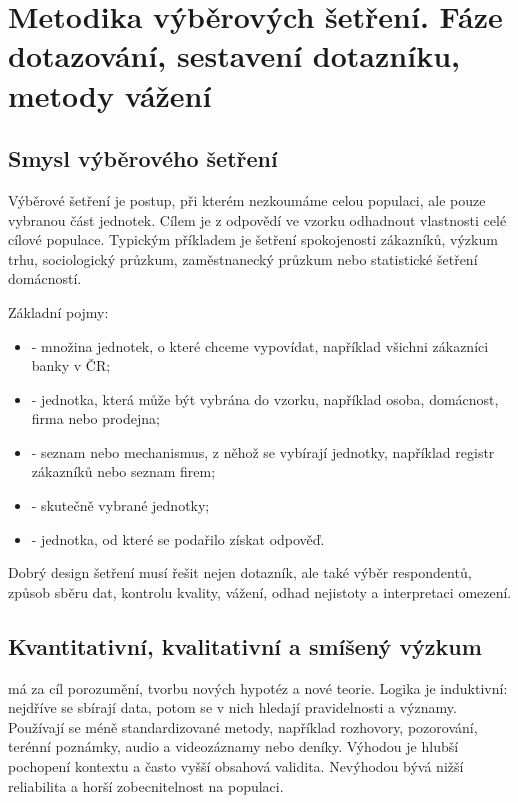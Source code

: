 \section{Metodika výběrových šetření. Fáze dotazování, sestavení dotazníku, metody vážení}

\subsection{Smysl výběrového šetření}
Výběrové šetření je postup, při kterém nezkoumáme celou populaci, ale pouze vybranou část jednotek.
Cílem je z odpovědí ve vzorku odhadnout vlastnosti celé cílové populace. Typickým příkladem je
šetření spokojenosti zákazníků, výzkum trhu, sociologický průzkum, zaměstnanecký průzkum nebo
statistické šetření domácností.

Základní pojmy:
\begin{itemize}
  \item {} - množina jednotek, o které chceme vypovídat, například všichni
  zákazníci banky v ČR;
  \item {} - jednotka, která může být vybrána do vzorku, například osoba,
  domácnost, firma nebo prodejna;
  \item {} - seznam nebo mechanismus, z něhož se vybírají jednotky, například
  registr zákazníků nebo seznam firem;
  \item {} - skutečně vybrané jednotky;
  \item {} - jednotka, od které se podařilo získat odpověď.
\end{itemize}

Dobrý design šetření musí řešit nejen dotazník, ale také výběr respondentů, způsob sběru dat,
kontrolu kvality, vážení, odhad nejistoty a interpretaci omezení.

\subsection{Kvantitativní, kvalitativní a smíšený výzkum}
 má za cíl porozumění, tvorbu nových hypotéz a nové teorie. Logika je
induktivní: nejdříve se sbírají data, potom se v nich hledají pravidelnosti a významy. Používají se
méně standardizované metody, například rozhovory, pozorování, terénní poznámky, audio a videozáznamy
nebo deníky. Výhodou je hlubší pochopení kontextu a často vyšší obsahová validita. Nevýhodou bývá
nižší reliabilita a horší zobecnitelnost na populaci.

